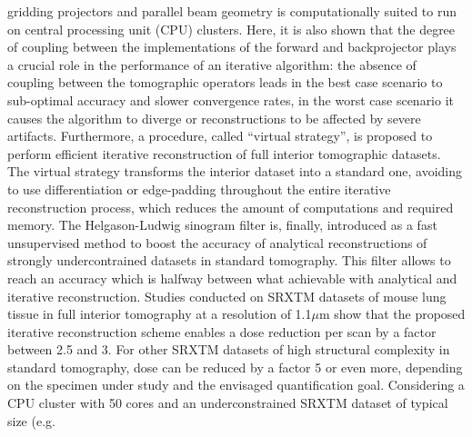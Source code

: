 {gridding projectors and parallel beam geometry is computationally suited to run on central processing unit (CPU) clusters.
\newline
Here, it is also shown that the degree of coupling between the implementations
of the forward and backprojector plays a crucial role in the performance of an iterative algorithm: the absence of coupling
between the tomographic operators leads in the best case scenario to sub-optimal accuracy and slower convergence rates,
in the worst case scenario it causes the algorithm to diverge or reconstructions to be affected by severe artifacts.
\newline
Furthermore,
a procedure, called ``virtual strategy'', is proposed to perform efficient iterative reconstruction of full interior tomographic datasets.
The virtual strategy transforms the interior dataset into a standard one, avoiding to use differentiation or edge-padding throughout the 
entire iterative reconstruction process, which reduces the amount of computations and required memory.
\newline
The Helgason-Ludwig sinogram filter is, finally, introduced as a fast unsupervised method to boost the accuracy
of analytical reconstructions of strongly undercontrained datasets in standard tomography. This filter allows to reach
an accuracy which is halfway between what achievable with analytical and iterative reconstruction.
\newline\newline
Studies conducted on SRXTM datasets of mouse lung tissue in full interior tomography at a resolution of 1.1$\mu$m show that the
proposed iterative reconstruction scheme enables a dose reduction per scan by a factor between 2.5 and 3.
For other SRXTM datasets of high structural complexity in standard tomography, dose can be reduced by a factor 5 or even more, 
depending on the specimen under study and the envisaged quantification goal.
Considering a CPU cluster with 50 cores and an underconstrained SRXTM dataset of typical size (e.g. 
}
